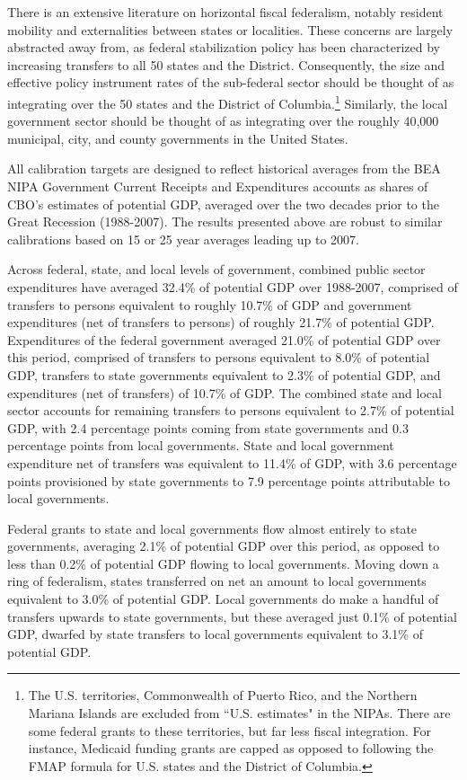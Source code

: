 \documentclass[12pt,letterpaper]{article}
\begin{document}
There is an extensive literature on horizontal fiscal federalism, notably resident mobility and externalities between states or localities. These concerns are largely abstracted away from, as federal stabilization policy has been characterized by increasing transfers to all 50 states and the District. Consequently, the size and effective policy instrument rates of the sub-federal sector should be thought of as integrating over the 50 states and the District of Columbia.\footnote{ The U.S. territories, Commonwealth of Puerto Rico, and the Northern Mariana Islands are excluded from ``U.S. estimates" in the NIPAs. There are some federal grants to these territories, but far less fiscal integration. For instance, Medicaid funding grants are capped as opposed to following the FMAP formula for U.S. states and the District of Columbia.} Similarly, the local government sector should be thought of as integrating over the roughly 40,000 municipal, city, and county governments in the United States. 

All calibration targets are designed to reflect historical averages from the BEA NIPA Government Current Receipts and Expenditures accounts as shares of CBO's estimates of potential GDP, averaged over the two decades prior to the Great Recession (1988-2007). The results presented above are robust to similar calibrations based on 15 or 25 year averages leading up to 2007.

Across federal, state, and local levels of government, combined public sector expenditures have averaged 32.4\% of potential GDP over 1988-2007, comprised of transfers to persons equivalent to roughly 10.7\% of GDP and government expenditures (net of transfers to persons) of roughly 21.7\% of potential GDP.  Expenditures of the federal government averaged 21.0\% of potential GDP over this period, comprised of transfers to persons equivalent to 8.0\% of potential GDP, transfers to state governments equivalent to 2.3\% of potential GDP, and expenditures (net of transfers) of 10.7\% of GDP. The combined state and local sector accounts for remaining transfers to persons equivalent to 2.7\% of potential GDP, with 2.4 percentage points coming from state governments and 0.3 percentage points from local governments. State and local government expenditure net of transfers was equivalent to 11.4\% of GDP, with 3.6 percentage points provisioned by state governments to 7.9 percentage points attributable to local governments. 

Federal grants to state and local governments flow almost entirely to state governments, averaging 2.1\% of potential GDP over this period, as opposed to less than 0.2\% of potential GDP flowing to local governments. Moving down a ring of federalism, states transferred on net an amount to local governments equivalent to 3.0\% of potential GDP. Local governments do make a handful of transfers upwards to state governments, but these averaged just 0.1\% of potential GDP, dwarfed by state transfers to local governments equivalent to 3.1\% of potential GDP.
\end{document}

